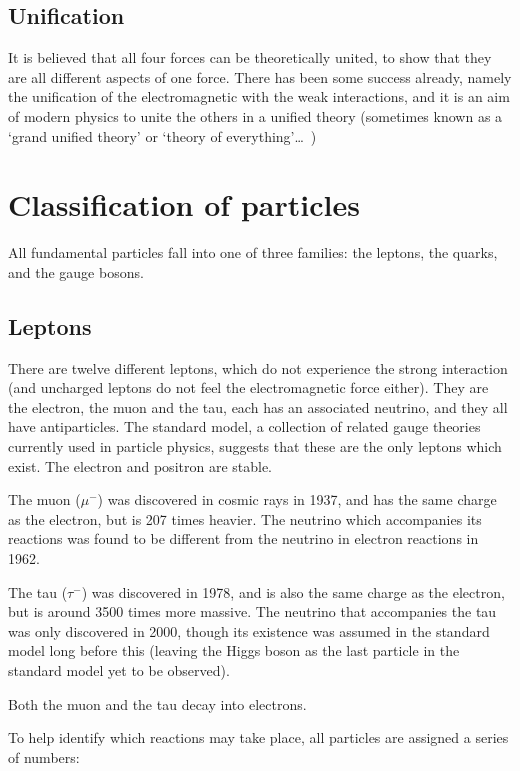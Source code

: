 \documentclass[a4paper,12pt]{article}
\begin{document}
\subsection{Unification}
It is believed that all four forces can be theoretically united, to show that they are all different aspects of one force.  There has been some success already, namely the unification of the electromagnetic with the weak interactions, and it is an aim of modern physics to unite the others in a unified theory (sometimes known as a `grand unified theory' or `theory of everything'\ldots\ )


\section{Classification of particles}
All fundamental particles fall into one of three families: the leptons, the quarks, and the gauge bosons.

\subsection{Leptons}

There are twelve different leptons, which do not experience the strong interaction (and uncharged leptons do not feel the electromagnetic force either).  They are the electron, the muon and the tau, each has an associated neutrino, and they all have antiparticles.  The standard model, a collection of related gauge theories currently used in particle physics, suggests that these are the only leptons which exist.  The electron and positron are stable.

The muon ($\mu^{-}$) was discovered in cosmic rays in 1937, and has the same charge as the electron, but is 207 times heavier.  The neutrino which accompanies its reactions was found to be different from the neutrino in electron reactions in 1962.

The tau ($\tau^{-}$) was discovered in 1978, and is also the same charge as the electron, but is around 3500 times more massive.  The neutrino that accompanies the tau was only discovered in 2000, though its existence was assumed in the standard model long before this (leaving the Higgs boson as the last particle in the standard model yet to be observed).

Both the muon and the tau decay into electrons.

To help identify which reactions may take place, all particles are assigned a series of numbers:\\
\end{document}
